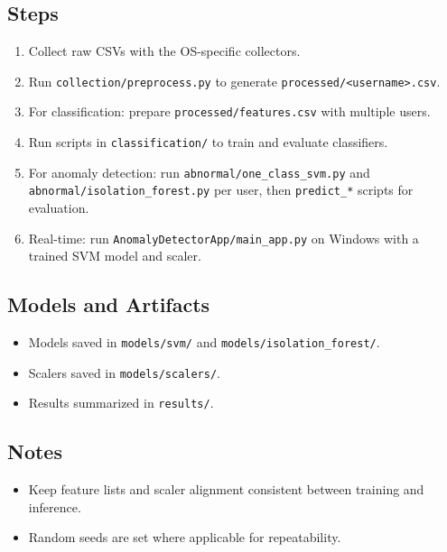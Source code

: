 \documentclass[
  12pt,
]{article}
\providecommand{\tightlist}{%
  \setlength{\itemsep}{0pt}\setlength{\parskip}{0pt}}
\begin{document}
\subsection{Steps}\label{steps}

\begin{enumerate}
\def\labelenumi{\arabic{enumi}.}
\tightlist
\item
  Collect raw CSVs with the OS-specific collectors.
\item
  Run \texttt{collection/preprocess.py} to generate
  \texttt{processed/\textless{}username\textgreater{}.csv}.
\item
  For classification: prepare \texttt{processed/features.csv} with
  multiple users.
\item
  Run scripts in \texttt{classification/} to train and evaluate
  classifiers.
\item
  For anomaly detection: run \texttt{abnormal/one\_class\_svm.py} and
  \texttt{abnormal/isolation\_forest.py} per user, then
  \texttt{predict\_*} scripts for evaluation.
\item
  Real-time: run \texttt{AnomalyDetectorApp/main\_app.py} on Windows
  with a trained SVM model and scaler.
\end{enumerate}

\subsection{Models and Artifacts}\label{models-and-artifacts}

\begin{itemize}
\tightlist
\item
  Models saved in \texttt{models/svm/} and
  \texttt{models/isolation\_forest/}.
\item
  Scalers saved in \texttt{models/scalers/}.
\item
  Results summarized in \texttt{results/}.
\end{itemize}

\subsection{Notes}\label{notes}

\begin{itemize}
\tightlist
\item
  Keep feature lists and scaler alignment consistent between training
  and inference.
\item
  Random seeds are set where applicable for repeatability.
\end{itemize}
\end{document}
